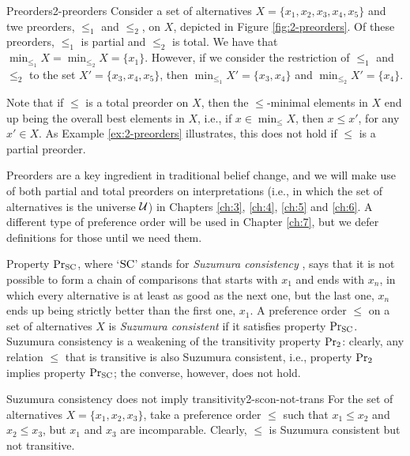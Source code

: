 \begin{xmpl}{Preorders}{2-preorders}
	Consider a set of alternatives $X=\{x_1,x_2,x_3,x_4,x_5\}$ 
	and twe preorders, $\le_1$ and $\le_2$, on $X$,
	depicted in Figure \ref{fig:2-preorders}.
	Of these preorders, $\le_1$ is partial and $\le_2$ is total.
	We have that $\min_{\le_1}X = \min_{\le_2}X = \{x_1\}$.
	However, if we consider the restriction of $\le_1$ and $\le_2$
	to the set $X'=\{x_3,x_4,x_5\}$,
	then $\min_{\le_1}X' = \{x_3,x_4\}$
	and 
	$\min_{\le_2}X' = \{x_4\}$.
\end{xmpl}

Note that if $\le$ is a total preorder on $X$, 
then the $\le$-minimal elements in $X$ end up being the overall best elements in $X$,
i.e., if $x\in\min_\le X$, then $x\le x'$, for any $x'\in X$. 
As Example \ref{ex:2-preorders} illustrates, 
this does not hold if $\le$ is a partial preorder.

Preorders are a key ingredient in traditional belief change,
and we will make use of both partial and total preorders on interpretations
(i.e., in which the set of alternatives is the universe $\mathcal{U}$)
in Chapters \ref{ch:3}, \ref{ch:4}, \ref{ch:5} and \ref{ch:6}.
A different type of preference order will be used in Chapter \ref{ch:7},
but we defer definitions for those until we need them.

Property $\mathrm{Pr}_{{\mathrm{SC}}}$, 
where `${\mathrm{SC}}$' stands for \emph{Suzumura consistency} \cite{Suzumura76,Suzumura83,BossertS10},
says that it is not possible to form a chain of comparisons 
that starts with $x_1$ and ends with $x_n$, 
in which every alternative is at least as good as the next one,
but the last one, $x_n$ ends up being strictly better than the first one, $x_1$.
A preference order $\le$ on a set of alternatives $X$ is \emph{Suzumura consistent}
if it satisfies property $\mathrm{Pr}_{{\mathrm{SC}}}$.
Suzumura consistency
is a weakening of the transitivity property $\mathrm{Pr}_{2}$:
clearly, any relation $\le$ that is transitive 
is also Suzumura consistent,
i.e., property $\mathrm{Pr}_{2}$ implies property $\mathrm{Pr}_{{\mathrm{SC}}}$;
the converse, however, does not hold.

\begin{xmpl}{Suzumura consistency does not imply transitivity}{2-scon-not-trans}
	For the set of alternatives $X=\{x_1,x_2,x_3\}$,
	take a preference order $\le$ such that 
	$x_1\le x_2$ and $x_2\le x_3$, but $x_1$ and $x_3$ are incomparable.
	Clearly, $\le$ is Suzumura consistent but not transitive.
\end{xmpl}

